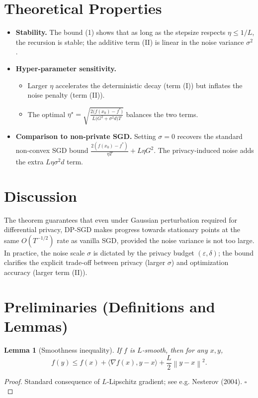 \documentclass{article}
\newtheorem{lemma}{Lemma}
\newcommand{\norm}[1]{\left\|#1\right\|}
\newcommand{\grad}{\nabla}
\begin{document}
\section*{Theoretical Properties}
\begin{itemize}
    \item \textbf{Stability.} The bound (1) shows that as long as the stepsize respects
          $\eta\le 1/L$, the recursion is stable; the additive term (II) is linear in
          the noise variance $\sigma^{2}$.
    \item \textbf{Hyper‑parameter sensitivity.}
          \begin{itemize}
              \item Larger $\eta$ accelerates the deterministic decay (term (I)) but
                    inflates the noise penalty (term (II)).
              \item The optimal $\eta^{\star}= \sqrt{\tfrac{2\bigl(f(x_0)-f^{*}\bigr)}{L\bigl(G^{2}+\sigma^{2}d\bigr)T}}$
                    balances the two terms.
          \end{itemize}
    \item \textbf{Comparison to non‑private SGD.}
          Setting $\sigma=0$ recovers the standard non‑convex SGD bound
          $\frac{2(f(x_0)-f^{*})}{\eta T}+L\eta G^{2}$.
          The privacy‑induced noise adds the extra $L\eta\sigma^{2}d$ term.
\end{itemize}

\section*{Discussion}
The theorem guarantees that even under Gaussian perturbation required for differential
privacy, DP‑SGD makes progress towards stationary points at the same
$O(T^{-1/2})$ rate as vanilla SGD, provided the noise variance is not too large.
In practice, the noise scale $\sigma$ is dictated by the privacy budget
$(\varepsilon,\delta)$; the bound clarifies the explicit trade‑off between
privacy (larger $\sigma$) and optimization accuracy (larger term (II)).

\newpage
\section*{Preliminaries (Definitions and Lemmas)}
\begin{lemma}[Smoothness inequality]\label{lem:smooth}
If $f$ is $L$‑smooth, then for any $x,y$,
\[
f(y)\le f(x)+\langle\grad f(x),y-x\rangle+\frac{L}{2}\norm{y-x}^{2}.
\tag{2}
\]
\end{lemma}
\begin{proof}
Standard consequence of $L$‑Lipschitz gradient; see e.g. Nesterov (2004). \hfill $\square$
\end{proof}
\end{document}
